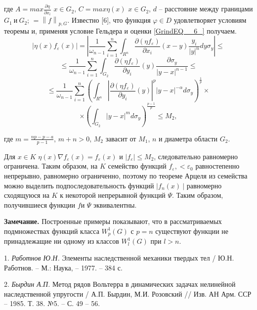 где $A=max\frac{\partial \eta }{\partial x_{i} }$ $x\in G_{2}$, $C=max\eta \left(x\right)$ $x\in G_{2} $, $d$ -- расстояние между границами
$G_1\ \mathrm{\textrm{и}}\ G_2$; $=\left\| f\right\| _{p,G} $. Известно [6], что функция $\varphi \in D$ удовлетворяет условиям теоремы и, применяя условие Гельдера и оценки \ref{GrindEQ__6_} получаем.
$$\left|\eta \left(x\right)f_{\varepsilon } \left(x\right)\right|=\left|\frac{1}{\omega _{n-1} } \sum _{i=1}^{n}\int _{R^{n} }\frac{\partial \left(\eta f_{\varepsilon } \right)}{\partial x_{i} } \left(x-y\right)\frac{y_{i} }{\left|y\right|^{n} } dy\sigma _{y}   \right|\le$$
$$\le\frac{1}{\omega _{n-1} } \sum _{i=1}^{n}\int _{G_{2} }\frac{\partial \left(\eta f_{\varepsilon } \right)}{\partial y_{i} } \left(y\right)\frac{\partial \sigma _{y} }{\left|y-x\right|^{n-1} }\le$$
$$\le \frac{1}{\omega _{n-1} } \sum _{i=1}^{n}\left(\int _{R^{n} }\left|\frac{\partial \left(\eta f_{\varepsilon } \right)}{\partial y_{i} } \left(y\right)\right|^{p} \left|y-x\right|^{-\alpha } d\sigma _{y}  \right) ^{\frac{1}{p} } \times$$
$$\times\left(\int _{G_{2} }\left|y-x\right|^{m} d\sigma _{y}  \right)^{\frac{p-1}{p} } \le M_{2},$$

\noindent где $m=\frac{np-p-a}{p-1}$, $m+n>0$, $M_2$ завасит от $M_1$, $n$ и диаметра области $G_2$.

Для $x\in K$ $\eta (x)\nabla f_{\varepsilon } (x)=f_{\varepsilon } (x)$ и $|f_{\varepsilon } |\le M_{2} $, следовательно равномерно ограничена.
Таким образом, на $K$ семейство функций $f_{\varepsilon } ,<\varepsilon _{0} $ равностепенно непрерывно, равномерно ограниченно,
поэтому по теореме Арцеля из семейства можно выделить подпоследовательность функций $\left|f_n(x)\ \right|$ равномерно сходящуюся на $K$ к некоторой непрерывной функций $\Psi $.
Таким образом, получившиеся функции $f$и $\Psi $ эквивалентны.

\textbf{Замечание.} Построенные примеры показывают, что в рассматриваемых подмножествах функций класса $W^1_p(G)$ с $p=n$
существуют функции не принадлежащие ни одному из классов $W^1_l\left(G\right)$ при $l>n$.


\litlist

1. {\it Работнов Ю.Н.} Элементы наследственной механики твердых тел / Ю.Н. Работнов. – М.: Наука, – 1977. – 384 с.

2. {\it Бырдин А.П.} Метод рядов Вольтерра в динамических задачах  нелинейной наследственной упругости /  А.П. Бырдин, М.И. Розовский // Изв. АН Арм. ССР – 1985. Т. 38. №5. – С. 49 – 56. 
